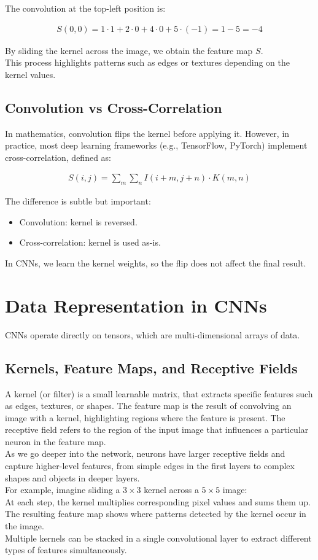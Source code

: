 The convolution at the top-left position is:

\begin{align}
    S(0,0)=1\cdot1+2\cdot0+4\cdot0+5\cdot(-1)=1-5=-4
\end{align}

By sliding the kernel across the image, we obtain the feature map \(S\).
\\
This process highlights patterns such as edges or textures depending on the kernel values.


\subsection{Convolution vs Cross-Correlation}

In mathematics, convolution flips the kernel before applying it. However, in practice, most deep learning frameworks (e.g., TensorFlow, PyTorch) implement cross-correlation, defined as:

\begin{align}
    S(i,j)=\sum_m\sum_n I(i+m,j+n)\cdot K(m,n)
\end{align}

The difference is subtle but important:
\begin{itemize}
    \item Convolution: kernel is reversed.
    \item Cross-correlation: kernel is used as-is.
\end{itemize}

In CNNs, we learn the kernel weights, so the flip does not affect the final result.

\section{Data Representation in CNNs}

CNNs operate directly on tensors, which are multi-dimensional arrays of data.

\subsection{Kernels, Feature Maps, and Receptive Fields}
A kernel (or filter) is a small learnable matrix, that extracts specific features such as edges, textures, or shapes. The feature map is the result of convolving an image with a kernel, highlighting regions where the feature is present. The receptive field refers to the region of the input image that influences a particular neuron in the feature map.
\\
As we go deeper into the network, neurons have larger receptive fields and capture higher-level features, from simple edges in the first layers to complex shapes and objects in deeper layers.
\\
For example, imagine sliding a \(3\times3\) kernel across a \(5\times5\) image:
\\
At each step, the kernel multiplies corresponding pixel values and sums them up. The resulting feature map shows where patterns detected by the kernel occur in the image.
\\
Multiple kernels can be stacked in a single convolutional layer to extract different types of features simultaneously.